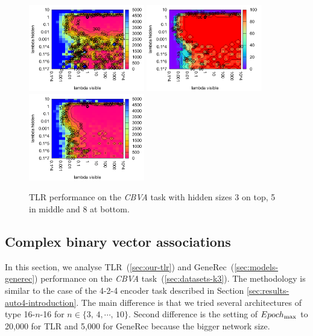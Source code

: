 \begin{figure}[H]
  \includegraphics[width=0.45\textwidth]{img/k3/tlr-5-epoch.pdf}  
  \includegraphics[width=0.45\textwidth]{img/k3/tlr-8-success.pdf} 
  \includegraphics[width=0.45\textwidth]{img/k3/tlr-8-epoch.pdf}    
  \caption{TLR performance on the \emph{CBVA} task with hidden sizes 3 on top, 5 in middle and 8 at bottom.}
  \label{fig:results-tlr-k3-performance}
\end{figure}

\subsection{Complex binary vector associations} 
\label{sec:results-k3}

In this section, we analyse TLR~(\ref{sec:our-tlr}) and GeneRec~(\ref{sec:models-generec}) performance on the \emph{CBVA} task~(\ref{sec:datasets-k3}). The methodology is similar to the case of the 4-2-4 encoder task described in Section \ref{sec:results-auto4-introduction}. The main difference is that we tried several architectures of type 16-$n$-16 for $n \in \{3,\,4,\cdots,\,10\}$. Second difference is the setting of $Epoch_{\rm max}$ to 20,000 for TLR and 5,000 for GeneRec because the bigger network size. 


